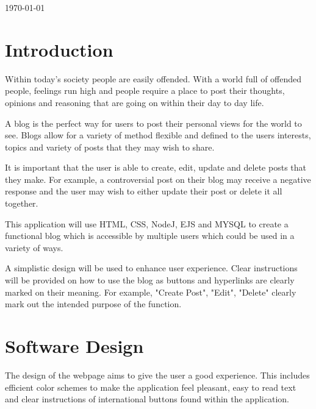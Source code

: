 \documentclass[10pt, a4paper]{article}
\begin{document}
\begin{titlepage}
	{\large\today} %
	
	
	 
	
	\vfill %
	
\end{titlepage}

\tableofcontents  \pagebreak
    \section{Introduction}
  Within today's society people are easily offended.  With a world full of offended people, feelings run high and people require a place to post their thoughts, opinions and reasoning that are going on within their day to day life. 

A blog is the perfect way for users to post their personal views for the world to see.  Blogs allow for a variety of method flexible and defined to the users interests, topics and variety of posts
that they may wish to share. 

It is important that the user is able to create, edit, update and delete posts that they make.  For example, a controversial post on their blog may receive a negative response and the user may wish to either update their post or delete it all together. 

This application will use HTML, CSS, NodeJ, EJS and MYSQL  to create a functional blog which is accessible by multiple users which could be used in a variety of ways. 

A simplistic design will be used to enhance user experience.  Clear instructions will be provided on how to use the blog as buttons and hyperlinks are clearly marked on their meaning.  For example, "Create Post", "Edit", "Delete" clearly mark out the intended purpose of the function.
    
	
	\section{Software Design}
	The design of the webpage aims to give the user a good experience.  This includes efficient color schemes to make the application feel pleasant, easy to read text and clear instructions of international  buttons found within the application. 
	
\end{document}
